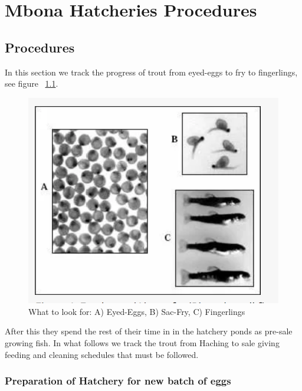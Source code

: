 \chapter{Mbona Hatcheries Procedures}

\section{Procedures}


In this section we track the progress of trout from eyed-eggs to fry to fingerlings, see figure ~\ref{fig:EggsFryFingerlings}.

\begin{figure}[H]
  \centering
   \includegraphics[scale = 0.6]{images/EggsFryFingerlings.png}
  \caption{What to look for: A) Eyed-Eggs, B) Sac-Fry, C) Fingerlings}
   \label{fig:EggsFryFingerlings}
\end{figure}

After this they spend the rest of their time in in the hatchery ponds as pre-sale growing fish.
In what follows we track the trout from Haching to sale giving feeding and cleaning schedules 
that must be followed.

\subsection{Preparation of Hatchery for new batch of eggs}

